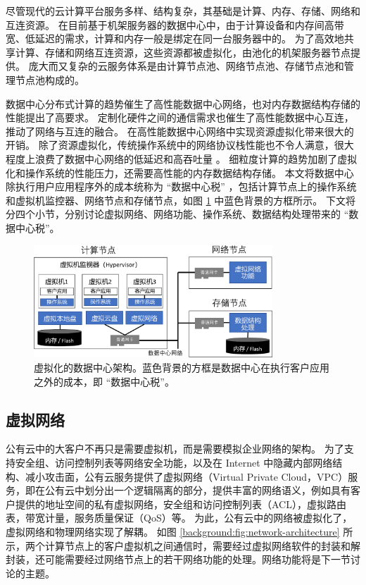 尽管现代的云计算平台服务多样、结构复杂，其基础是计算、内存、存储、网络和互连资源。
在目前基于机架服务器的数据中心中，由于计算设备和内存间高带宽、低延迟的需求，计算和内存一般是绑定在同一台服务器中的。
为了高效地共享计算、存储和网络互连资源，这些资源都被虚拟化，由池化的机架服务器节点提供。
庞大而又复杂的云服务体系是由计算节点池、网络节点池、存储节点池和管理节点池构成的。
\fi

数据中心分布式计算的趋势催生了高性能数据中心网络，也对内存数据结构存储的性能提出了高要求。
定制化硬件之间的通信需求也催生了高性能数据中心互连，推动了网络与互连的融合。
在高性能数据中心网络中实现资源虚拟化带来很大的开销。
除了资源虚拟化，传统操作系统中的网络协议栈性能也不令人满意，很大程度上浪费了数据中心网络的低延迟和高吞吐量 \cite{barroso2017attack}。
细粒度计算的趋势加剧了虚拟化和操作系统的性能压力，还需要高性能的内存数据结构存储。
本文将数据中心除执行用户应用程序外的成本统称为 ``数据中心税'' \cite{barroso2018datacenter}，包括计算节点上的操作系统和虚拟机监控器、网络节点和存储节点，如图 \ref{background:fig:virt-architecture} 中蓝色背景的方框所示。
下文将分四个小节，分别讨论虚拟网络、网络功能、操作系统、数据结构处理带来的 ``数据中心税''。


\begin{figure}[htbp]
	\centering
	\includegraphics[width=0.8\textwidth]{figures/virt_arch.pdf}
	\caption{虚拟化的数据中心架构。蓝色背景的方框是数据中心在执行客户应用之外的成本，即 ``数据中心税''。}
	\label{background:fig:virt-architecture}
\end{figure}


\subsection{虚拟网络}


公有云中的大客户不再只是需要虚拟机，而是需要模拟企业网络的架构。
为了支持安全组、访问控制列表等网络安全功能，以及在 Internet 中隐藏内部网络结构、减小攻击面，公有云服务提供了虚拟网络（Virtual Private Cloud，VPC）服务，即在公有云中划分出一个逻辑隔离的部分，提供丰富的网络语义，例如具有客户提供的地址空间的私有虚拟网络，安全组和访问控制列表（ACL），虚拟路由表，带宽计量，服务质量保证（QoS）等。 
为此，公有云中的网络被虚拟化了，虚拟网络和物理网络实现了解耦。
如图 \ref{background:fig:network-architecture} 所示，两个计算节点上的客户虚拟机之间通信时，需要经过虚拟网络软件的封装和解封装，还可能需要经过网络节点上的若干网络功能的处理。网络功能将是下一节讨论的主题。

